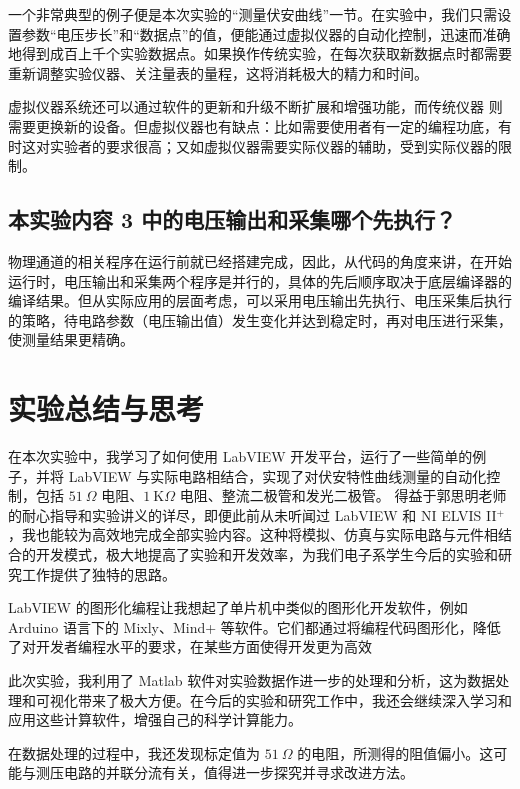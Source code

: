\documentclass[UTF8]{article}
\def\KO{\ \mathrm{K}\Omega}
\theoremstyle{MyLineTheoremStyle} %
\theoremstyle{MyBlockTheoremStyle} %
\theoremstyle{MySubsubsectionStyle} %
\begin{document}
一个非常典型的例子便是本次实验的“测量伏安曲线”一节。在实验中，我们只需设置参数“电压步长”和“数据点”的值，便能通过虚拟仪器的自动化控制，迅速而准确地得到成百上千个实验数据点。如果换作传统实验，在每次获取新数据点时都需要重新调整实验仪器、关注量表的量程，这将消耗极大的精力和时间。

虚拟仪器系统还可以通过软件的更新和升级不断扩展和增强功能，而传统仪器
则需要更换新的设备。但虚拟仪器也有缺点：比如需要使用者有一定的编程功底，有时这对实验者的要求很高；又如虚拟仪器需要实际仪器的辅助，受到实际仪器的限制。



\subsection{本实验内容 3 中的电压输出和采集哪个先执行？}

物理通道的相关程序在运行前就已经搭建完成，因此，从代码的角度来讲，在开始运行时，电压输出和采集两个程序是并行的，具体的先后顺序取决于底层编译器的编译结果。但从实际应用的层面考虑，可以采用电压输出先执行、电压采集后执行的策略，待电路参数（电压输出值）发生变化并达到稳定时，再对电压进行采集，使测量结果更精确。

\section{实验总结与思考}

在本次实验中，我学习了如何使用 LabVIEW 开发平台，运行了一些简单的例子，并将 LabVIEW 与实际电路相结合，实现了对伏安特性曲线测量的自动化控制，包括 $51 \ \Omega$ 电阻、$1 \KO$ 电阻、整流二极管和发光二极管。
得益于郭思明老师的耐心指导和实验讲义的详尽，即便此前从未听闻过 LabVIEW 和 NI ELVIS II$^+$，我也能较为高效地完成全部实验内容。这种将模拟、仿真与实际电路与元件相结合的开发模式，极大地提高了实验和开发效率，为我们电子系学生今后的实验和研究工作提供了独特的思路。

LabVIEW 的图形化编程让我想起了单片机中类似的图形化开发软件，例如 Arduino 语言下的 Mixly、Mind+ 等软件。它们都通过将编程代码图形化，降低了对开发者编程水平的要求，在某些方面使得开发更为高效

此次实验，我利用了 Matlab 软件对实验数据作进一步的处理和分析，这为数据处理和可视化带来了极大方便。在今后的实验和研究工作中，我还会继续深入学习和应用这些计算软件，增强自己的科学计算能力。

在数据处理的过程中，我还发现标定值为 $51 \ \Omega$ 的电阻，所测得的阻值偏小。这可能与测压电路的并联分流有关，值得进一步探究并寻求改进方法。
\end{document}
